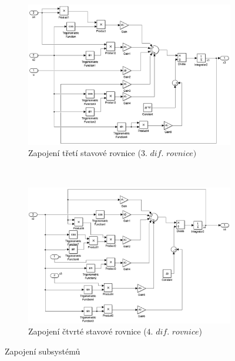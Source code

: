 \documentclass[11pt,a4paper]{article}
\begin{document}
\begin{figure}[H]
        \centering
        \begin{subfigure}[b]{0.5\textwidth}
                \includegraphics[width=\textwidth]{schema_nelinearni_3difrov.jpg}
                \caption{Zapojení třetí stavové rovnice ($3.$ $dif.$ $rovnice)$}
                \label{model:nelin:3diff}
        \end{subfigure}%
        ~ %
        \begin{subfigure}[b]{0.5\textwidth}
                \includegraphics[width=\textwidth]{schema_nelinearni_4difrov.jpg}
                \caption{Zapojení čtvrté stavové rovnice ($4.$ $dif.$ $rovnice$)}
                \label{model:nelin:4diff}
        \end{subfigure}
        \caption{Zapojení subsystémů}
        \label{model:nelin:sub}
\end{figure}
  
\end{document}
